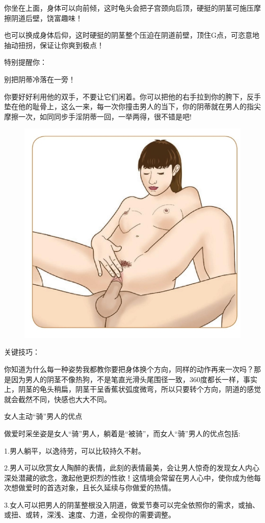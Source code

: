 \documentclass[12pt,UTF8]{ctexbook}
\begin{document}
你坐在上面，身体可以向前倾，这时龟头会把子宫颈向后顶，硬挺的阴茎可施压摩擦阴道后壁，饶富趣味！

也可以换成身体后仰，这时硬挺的阴茎整个压迫在阴道前壁，顶住G点，可恣意地抽动扭拐，保证让你爽到极点！

特别提醒你：

别把阴蒂冷落在一旁！

你要好好利用他的双手，不要让它们闲着。你可以把他的右手拉到你的胯下，反手垫在他的耻骨上，这么一来，每一次你撞击男人的当下，你的阴蒂就在男人的指尖摩擦一次，如同同步手淫阴蒂一回，一举两得，很不错是吧!

\begin{figure}[htbp]
	\centering
	\includegraphics[width=0.7\linewidth]{26}
	\caption{}
	\label{fig:1}
\end{figure}

关键技巧：

你知道为什么每一种姿势我都教你要把身体换个方向，同样的动作再来一次吗？那是因为男人的阴茎不像热狗，不是笔直光滑头尾围径一致，360度都长一样，事实上，阴茎的龟头稍扁，阴茎干呈香蕉状弧度微弯，所以只要转个方向，阴道的感觉就会截然不同，快感也大大不同。

女人主动“骑”男人的优点

做爱时采坐姿是女人“骑”男人，躺着是“被骑”，而女人“骑”男人的优点包括:

1.男人躺平，以逸待劳，可以比较持久不射。

2.男人可以欣赏女人陶醉的表情，此刻的表情最美，会让男人惊奇的发现女人内心深处潜藏的欲念，激起他更炽烈的性欲！这情境会常留在男人心中，使你成为他每次想做爱时的首选对象，且长久延续与你做爱的热情。

3.女人可以把男人的阴茎整根没入阴道，做爱节奏可以完全依照你的需求，或抽、或扭、或转，深浅、速度、力道，全视你的需要调整。
\end{document}
